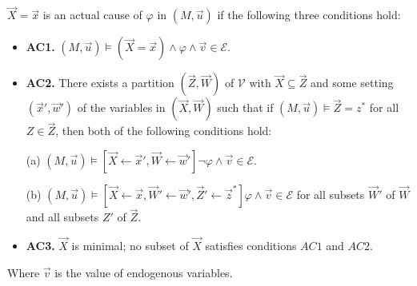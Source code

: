 \begin{definition}
    $\vec X = \vec x$ is an actual cause of $\varphi$ in $(M,\vec u)$ if the following three conditions hold:
    \begin{itemize}
        \item  \textbf{AC1.} $(M,\vec u)\models (\vec X = \vec x) \wedge \varphi \wedge \vec v \in \mathcal{E}$.
        \item  \textbf{AC2. }There exists a partition $(\vec Z, \vec W)$ of $\mathcal{V}$ with $\vec X \subseteq \vec Z$ and some setting $(\vec x',\vec w')$ of the variables in $(\vec X,\vec W)$ such that if $(M,\vec u)\models \vec Z = z^*$ for all $Z\in \vec Z$, then both of the following conditions hold:

              (a) $(M,\vec u)\models[\vec X \leftarrow \vec x', \vec W \leftarrow \vec w']\neg \varphi \wedge  \vec v \in \mathcal{E}$.

              (b) $(M,\vec u)\models[\vec X\leftarrow \vec x, \vec W' \leftarrow \vec w', \vec Z'\leftarrow \vec z^*]\varphi \wedge
              \vec v \in \mathcal{E}$ for all subsets $\vec W'$ of $\vec W$ and all subsets $Z'$ of $\vec Z$.

        \item  \textbf{AC3.} $\vec X$ is minimal; no subset of $\vec X$ satisfies conditions $AC1$ and $AC2$.
    \end{itemize}
    Where $\vec v$ is the value of endogenous variables.
\end{definition}
